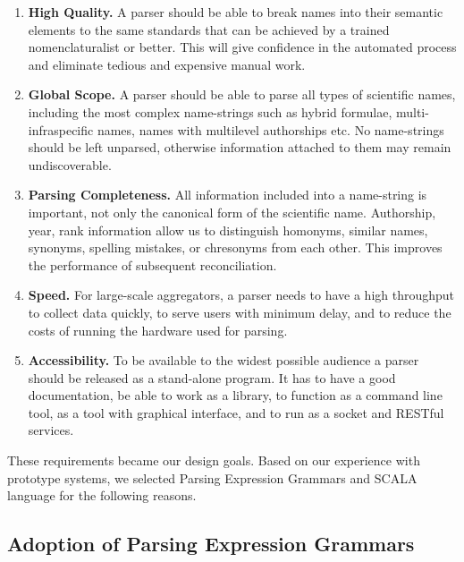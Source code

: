 \documentclass{bmcart}
\begin{document}
\begin{enumerate}

  \item \textbf{High Quality.} A parser should be able to break names into
    their semantic elements to the same standards that can be achieved by a
    trained nomenclaturalist or better. This will give confidence in the
    automated process and eliminate tedious and expensive manual work.

  \item \textbf{Global Scope.} A parser should be able to parse all types of
    scientific names, including the most complex name-strings such as hybrid
    formulae, multi-infraspecific names, names with multilevel authorships etc.
    No name-strings should be left unparsed, otherwise information attached to
    them may remain undiscoverable.

  \item \textbf{Parsing Completeness.} All information included into a
    name-string is important, not only the canonical form of the scientific
    name. Authorship, year, rank information allow us to distinguish homonyms,
    similar names, synonyms, spelling mistakes, or chresonyms from each other.
    This improves the performance of subsequent reconciliation.

  \item \textbf{Speed.} For large-scale aggregators, a parser needs to have a
    high throughput to collect data quickly, to serve users with minimum delay,
    and to reduce the costs of running the hardware used for parsing.

  \item \textbf{Accessibility.} To be available to the widest possible audience
    a parser should be released as a stand-alone program. It has to have a
    good documentation, be able to work as a library, to function as a command
    line tool, as a tool with graphical interface, and to run as a socket and
    RESTful services.

\end{enumerate}

These requirements became our design goals. Based on our experience with
prototype systems, we selected Parsing Expression Grammars and SCALA language
for the following reasons.

\subsection*{Adoption of Parsing Expression Grammars}
\end{document}
